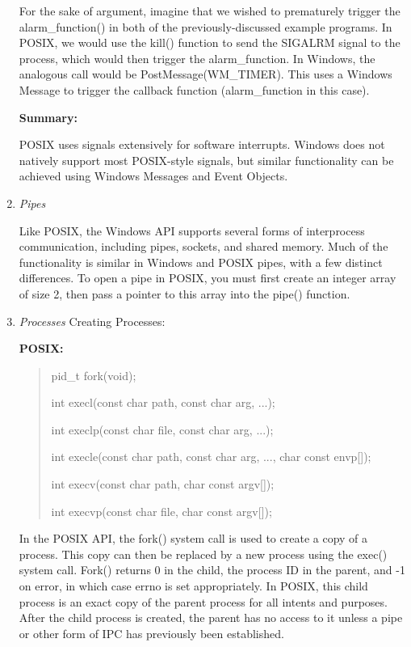 \documentclass[letterpaper,10pt,titlepage]{article}
\newcommand{\tab}{\hspace*{2em}} %
\begin{document}
\begin{enumerate}
\tab For the sake of argument, imagine that we wished to prematurely trigger the alarm\_function() in both of the previously-discussed example programs. In POSIX, we would use the kill() function to send the SIGALRM signal to the process, which would then trigger the alarm\_function. In Windows, the analogous call would be PostMessage(WM\_TIMER). This uses a Windows Message to trigger the callback function (alarm\_function in this case). \newline

\textbf{Summary:}

\tab POSIX uses signals extensively for software interrupts. Windows does not natively support most POSIX-style signals, but similar functionality can be achieved using Windows Messages and Event Objects. \newline

\item \emph{Pipes}

\tab Like POSIX, the Windows API supports several forms of interprocess communication, including pipes, sockets, and shared memory. Much of the functionality is similar in Windows and POSIX pipes, with a few distinct differences. To open a pipe in POSIX, you must first create an integer array of size 2, then pass a pointer to this array into the pipe() function. \newline

\item \emph{Processes}
Creating Processes: \newline

\textbf{POSIX:} 

\begin{quote}
pid\_t fork(void);

int execl(const char \*path, const char \*arg, ...);

int execlp(const char \*file, const char \*arg, ...);

int execle(const char \*path, const char \*arg, ..., char \*const envp[]);

int execv(const char \*path, char \*const argv[]);

int execvp(const char \*file, char \*const argv[]);
\end{quote}


\tab In the POSIX API, the fork() system call is used to create a copy of a process. This copy can then be replaced by a new process using the exec() system call. Fork() returns 0 in the child, the process ID in the parent, and -1 on error, in which case errno is set appropriately. In POSIX, this child process is an exact copy of the parent process for all intents and purposes. After the child process is created, the parent has no access to it unless a pipe or other form of IPC has previously been established. \newline


\end{enumerate}
\end{document}

